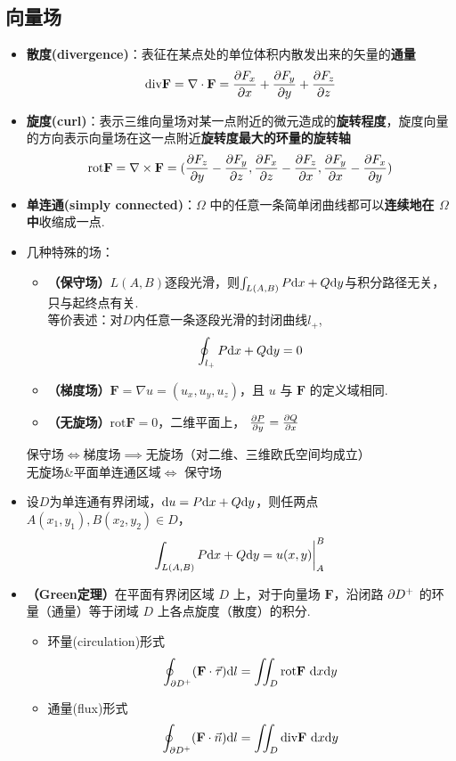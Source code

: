 \documentclass[./main.tex]{subfiles}
\begin{document}
  \subsection{向量场}
  \begin{itemize}
    \item \textbf{散度(divergence)}：表征在某点处的单位体积内散发出来的矢量的\textbf{通量}
    $$\text{div}\mathbf{F}=\nabla\cdot\mathbf{F}=\frac{\partial F_x}{\partial x}+\frac{\partial F_y}{\partial y}+\frac{\partial F_z}{\partial z}$$
    \item \textbf{旋度(curl)}：表示三维向量场对某一点附近的微元造成的\textbf{旋转程度}，旋度向量的方向表示向量场在这一点附近\textbf{旋转度最大的环量的旋转轴}
    $$\text{rot}\mathbf{F}=\nabla\times\mathbf{F}=(\frac{\partial F_z}{\partial y}-\frac{\partial F_y}{\partial z},\frac{\partial F_x}{\partial z}-\frac{\partial F_z}{\partial x},\frac{\partial F_y}{\partial x}-\frac{\partial F_x}{\partial y})$$
    \item \textbf{单连通(simply connected)}：$\Omega$ 中的任意一条简单闭曲线都可以\textbf{连续地在 $\Omega$ 中}收缩成一点.
    \item 几种特殊的场：
    \begin{itemize}
      \item \textbf{（保守场）}$L(A,B)$逐段光滑，则$\int_{L(A,B)}P\text{d}x+Q\text{d}y$与积分路径无关，只与起终点有关.\\
      等价表述：对$D$内任意一条逐段光滑的封闭曲线$l_+$,
      $$\oint_{l_+}P\text{d}x+Q\text{d}y=0$$
      \item \textbf{（梯度场）}$\mathbf{F}=\nabla u=(u_x,u_y,u_z)$，且 $u$ 与 $\mathbf{F}$ 的定义域相同.
      \item \textbf{（无旋场）}$\text{rot}\mathbf{F}=0$，二维平面上， $\frac{\partial P}{\partial y}=\frac{\partial Q}{\partial x}$      
    \end{itemize}
    保守场$\iff$梯度场$\implies$无旋场（对二维、三维欧氏空间均成立）\\
    无旋场\&平面单连通区域$\iff$ 保守场
  \item 设$D$为单连通有界闭域，$\text{d}u=P\text{d}x+Q\text{d}y$，则任两点$A(x_1,y_1),B(x_2,y_2)\in D$，
  $$\int_{L(A,B)}P\text{d}x+Q\text{d}y=u(x,y)\bigg|_A^B$$
  \item \textbf{（Green定理）}在平面有界闭区域 $D$ 上，对于向量场 $\mathbf{F}$，沿闭路 $\partial D^+$ 的环量（通量）等于闭域 $D$ 上各点旋度（散度）的积分.
  \begin{itemize}
    \item 环量(circulation)形式 $$\oint_{\p{D^+}}(\mathbf{F}\cdot\vec{\tau})\d{l}=\iint_D\text{rot}\mathbf{F}\ \d{x}\d{y}$$
    \item 通量(flux)形式 $$\oint_{\p{D^+}}(\mathbf{F}\cdot\vec{n})\d{l}=\iint_D\text{div}\mathbf{F}\ \d{x}\d{y}$$

\end{itemize}
\end{itemize}
\end{document}

